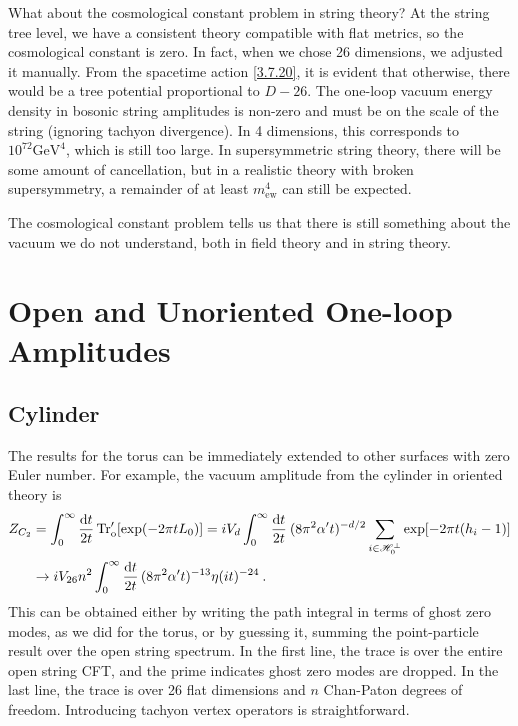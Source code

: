 What about the cosmological constant problem in string theory? At the string tree level, we have a consistent theory compatible with flat metrics, so the cosmological constant is zero. In fact, when we chose 26 dimensions, we adjusted it manually. From the spacetime action \eqref{3.7.20}, it is evident that otherwise, there would be a tree potential proportional to $D-26$. The one-loop vacuum energy density in bosonic string amplitudes is non-zero and must be on the scale of the string (ignoring tachyon divergence). In 4 dimensions, this corresponds to $10^{72} \mathrm{GeV}^{4}$, which is still too large. 
In supersymmetric string theory, there will be some amount of cancellation, but in a realistic theory with broken supersymmetry, a remainder of at least $m_{\mathrm{ew}}^{4}$ can still be expected. 

The cosmological constant problem tells us that there is still something about the vacuum we do not understand, both in field theory and in string theory. 

\section{\texorpdfstring{Open and Unoriented One-loop Amplitudes}{7.4 Open and Unoriented One-loop Amplitudes}} \label{sec:7.4} %

\subsection*{Cylinder} %
The results for the torus can be immediately extended to other surfaces with zero Euler number. %
For example, the vacuum amplitude from the cylinder in oriented theory is 
\begin{align}
	Z_{C_{2}} &=\int_{0}^{\infty} \frac{\mathrm{d} t}{2 t} \operatorname{Tr}_{\mathrm{o}}^{\prime}[\exp(-2 \pi t L_{0})]
	=i V_{d} \int_{0}^{\infty} \frac{\mathrm{d} t}{2 t}\: (8 \pi^{2} \alpha^{\prime} t)^{-d / 2} 
	\sum_{i \in \mathscr{H}_{0}^{\perp}} \exp[-2 \pi t(h_{i}-1)] \nonumber \\
	&\rightarrow i V_{26} n^{2} \int_{0}^{\infty} \frac{\mathrm{d} t}{2 t}\,(8 \pi^{2} \alpha^{\prime} t)^{-13} \eta(i t)^{-24} \:. \label{7.4.1} 
\end{align}
This can be obtained either by writing the path integral in terms of ghost zero modes, as we did for the torus, or by guessing it, summing the point-particle result over the open string spectrum. In the first line, the trace is over the entire open string CFT, and the prime indicates ghost zero modes are dropped. In the last line, the trace is over 26 flat dimensions and $n$ Chan-Paton degrees of freedom. Introducing tachyon vertex operators is straightforward. 

